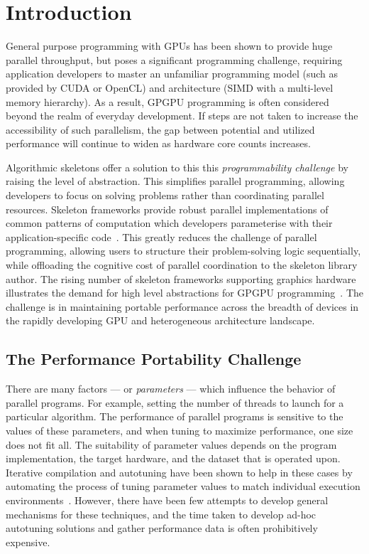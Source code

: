 \section{Introduction}\label{sec:introduction}

General purpose programming with GPUs has been shown to provide huge
parallel throughput, but poses a significant programming challenge,
requiring application developers to master an unfamiliar programming
model (such as provided by CUDA or OpenCL) and architecture (SIMD with
a multi-level memory hierarchy). As a result, GPGPU programming is
often considered beyond the realm of everyday development. If steps
are not taken to increase the accessibility of such parallelism, the
gap between potential and utilized performance will continue to widen
as hardware core counts increases.

Algorithmic skeletons offer a solution to this this
\emph{programmability challenge} by raising the level of
abstraction. This simplifies parallel programming, allowing developers
to focus on solving problems rather than coordinating parallel
resources. Skeleton frameworks provide robust parallel implementations
of common patterns of computation which developers parameterise with
their application-specific code~\cite{Gonzalez2010}. This greatly
reduces the challenge of parallel programming, allowing users to
structure their problem-solving logic sequentially, while offloading
the cognitive cost of parallel coordination to the skeleton library
author. The rising number of skeleton frameworks supporting graphics
hardware illustrates the demand for high level abstractions for GPGPU
programming~\cite{Enmyren2010,Marques2013}. The challenge is in
maintaining portable performance across the breadth of devices in the
rapidly developing GPU and heterogeneous architecture landscape.


\subsection{The Performance Portability Challenge}

There are many factors --- or \emph{parameters} --- which influence
the behavior of parallel programs. For example, setting the number of
threads to launch for a particular algorithm. The performance of
parallel programs is sensitive to the values of these parameters, and
when tuning to maximize performance, one size does not fit all. The
suitability of parameter values depends on the program implementation,
the target hardware, and the dataset that is operated upon. Iterative
compilation and autotuning have been shown to help in these cases by
automating the process of tuning parameter values to match individual
execution environments~\cite{Kisuki}. However, there have been few
attempts to develop general mechanisms for these techniques, and the
time taken to develop ad-hoc autotuning solutions and gather
performance data is often prohibitively expensive.

